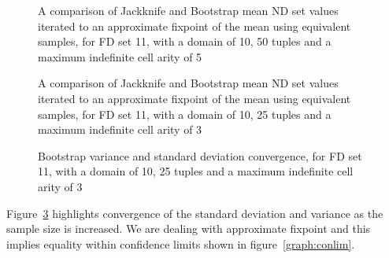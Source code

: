 \begin{figure}
\begin{minipage}{7cm}
\centerline{}
\end{minipage}
\hfill
\begin{minipage}{7cm}
\centerline{}
\end{minipage}
\caption{\label{graph:7.2} {A comparison of Jackknife and
Bootstrap mean ND set values iterated to an approximate fixpoint of
the mean using equivalent samples, for FD set 11, with a domain of 10,
50 tuples and a maximum indefinite cell arity of 5}}
\end{figure}


\begin{figure}
\begin{minipage}{7cm}
\centerline{}
\end{minipage}
\hfill
\begin{minipage}{7cm}
\centerline{}
\end{minipage}
\caption{\label{graph:7.3} {A comparison of Jackknife and
Bootstrap mean ND set values iterated to an approximate fixpoint of
the mean using equivalent samples, for FD set 11, with a domain of 10,
25 tuples and a maximum indefinite cell arity of 3}}
\end{figure}


\begin{figure}
\begin{minipage}{7cm}
\centerline{}
\end{minipage}
\hfill
\begin{minipage}{7cm}
\centerline{}
\end{minipage}
\caption{\label{graph:7.4} {
Bootstrap variance and standard deviation convergence, for FD set 11,
with a domain of 10, 25 tuples and a maximum indefinite cell arity of 3}}
\end{figure}


Figure~\ref{graph:7.4} highlights convergence of the standard
deviation and variance as the sample size is increased. We are dealing
with approximate fixpoint and this implies equality within confidence
limits shown in figure~\ref{graph:conlim}. 

